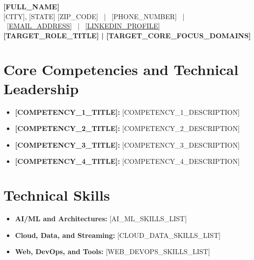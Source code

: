 \documentclass[9pt, letterpaper]{extarticle}
\begin{document}

\begin{center}
    {\huge \textbf{[FULL_NAME]}} \\ \vspace{2pt}
    \small [CITY], [STATE] [ZIP_CODE] \ | \ [PHONE_NUMBER] \ | \ \href{mailto:[EMAIL_ADDRESS]}{[EMAIL_ADDRESS]} \ | \ \href{https://[LINKEDIN_PROFILE]}{[LINKEDIN_PROFILE]} \\ \vspace{2pt}
    \textbf{\large [TARGET_ROLE_TITLE] | [TARGET_CORE_FOCUS_DOMAINS]}
\end{center}

\vspace{-4pt}
\begin{center}
\small
\begin{minipage}{0.95\textwidth}
\end{minipage}
\end{center}

\vspace{-4pt}
\section{Core Competencies and Technical Leadership}
\begin{itemize}
    \item \textbf{[COMPETENCY_1_TITLE]:} [COMPETENCY_1_DESCRIPTION]
    \item \textbf{[COMPETENCY_2_TITLE]:} [COMPETENCY_2_DESCRIPTION]
    \item \textbf{[COMPETENCY_3_TITLE]:} [COMPETENCY_3_DESCRIPTION]
    \item \textbf{[COMPETENCY_4_TITLE]:} [COMPETENCY_4_DESCRIPTION]
\end{itemize}

\section{Technical Skills}
\begin{itemize}
    \item \textbf{AI/ML and Architectures:} [AI_ML_SKILLS_LIST]
    \item \textbf{Cloud, Data, and Streaming:} [CLOUD_DATA_SKILLS_LIST]
    \item \textbf{Web, DevOps, and Tools:} [WEB_DEVOPS_SKILLS_LIST]
\end{itemize}
\end{document}
